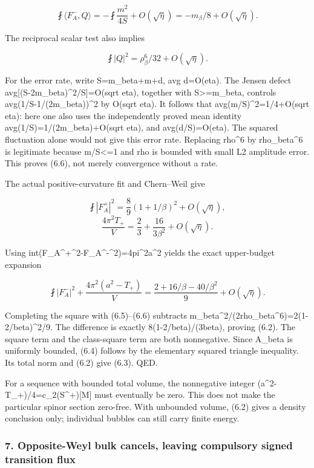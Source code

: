 \documentclass[
  10pt,
]{article}
\begin{document}
\[
 \fint\langle F_A^-,Q\rangle
     =-\fint\frac{m^2}{4S}+O(\sqrt\eta)
     =-m_\beta/8+O(\sqrt\eta).                         \tag{6.5}
\]

The reciprocal scalar test also implies

\[
 \fint |Q|^2=\rho_\beta^6/32+O(\sqrt\eta).             \tag{6.6}
\]

For the error rate, write S=m\_beta+m+d, avg d=O(eta). The Jensen defect
avg{[}(S-2m\_beta)\^{}2/S{]}=O(sqrt eta), together with
S\textgreater=m\_beta, controls avg(1/S-1/(2m\_beta))\^{}2 by O(sqrt
eta). It follows that avg(m/S)\^{}2=1/4+O(sqrt eta): here one also uses
the independently proved mean identity avg(1/S)=1/(2m\_beta)+O(sqrt
eta), and avg(d/S)=O(eta). The squared fluctuation alone would not give
this error rate. Replacing rho\^{}6 by rho\_beta\^{}6 is legitimate
because m/S\textless=1 and rho is bounded with small L2 amplitude error.
This proves (6.6), not merely convergence without a rate.

The actual positive-curvature fit and Chern--Weil give

\[
 \fint|F_A^+|^2=\frac89(1+1/\beta)^2+O(\sqrt\eta),
\] \[
 \frac{4\pi^2T_+}V=\frac23+\frac{16}{3\beta^2}
                                         +O(\sqrt\eta).
\]

Using
int(\textbar F\_A\^{}+\textbar\^{}2-\textbar F\_A\^{}-\textbar\^{}2)=4pi\^{}2a\^{}2
yields the exact upper-budget expansion

\[
 \fint|F_A^-|^2+\frac{4\pi^2(a^2-T_+)}V
 =\frac{2+16/\beta-40/\beta^2}{9}+O(\sqrt\eta).          \tag{6.7}
\]

Completing the square with (6.5)--(6.6) subtracts
m\_beta\^{}2/(2rho\_beta\^{}6)=2(1-2/beta)\^{}2/9. The difference is
exactly 8(1-2/beta)/(3beta), proving (6.2). The square term and the
class-square term are both nonnegative. Since A\_beta is uniformly
bounded, (6.4) follows by the elementary squared triangle inequality.
Its total norm and (6.2) give (6.3). QED.

For a sequence with bounded total volume, the nonnegative integer
(a\^{}2-T\_+)/4=c\_2(S\^{}+){[}M{]} must eventually be zero. This does
not make the particular spinor section zero-free. With unbounded volume,
(6.2) gives a density conclusion only; individual bubbles can still
carry finite energy.

\hypertarget{opposite-weyl-bulk-cancels-leaving-compulsory-signed-transition-flux}{%
\subsubsection{7. Opposite-Weyl bulk cancels, leaving compulsory signed
transition
flux}\label{opposite-weyl-bulk-cancels-leaving-compulsory-signed-transition-flux}}
\end{document}
